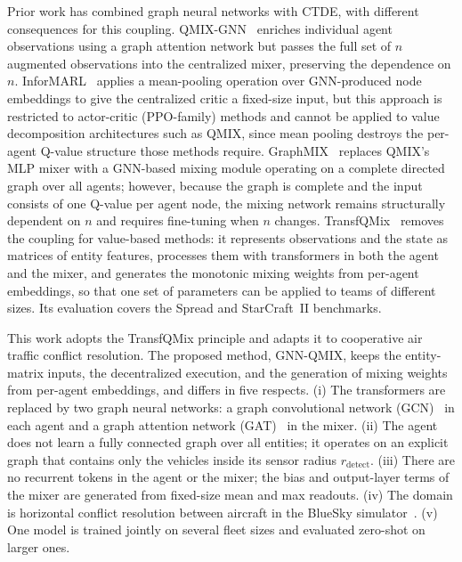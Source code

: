 Prior work has combined graph neural networks with CTDE, with different consequences for
this coupling. QMIX-GNN~\cite{qmix-gnn} enriches individual agent observations using a
graph attention network but passes the full set of $n$ augmented observations into the
centralized mixer, preserving the dependence on $n$. InforMARL~\cite{nayak2023scalable}
applies a mean-pooling operation over GNN-produced node embeddings to give the centralized
critic a fixed-size input, but this approach is restricted to actor-critic (PPO-family)
methods and cannot be applied to value decomposition architectures such as QMIX, since mean
pooling destroys the per-agent Q-value structure those methods require.
GraphMIX~\cite{naderializadeh2021graphconvolutionalvaluedecomposition} replaces QMIX's MLP
mixer with a GNN-based mixing module operating on a complete directed graph over all
agents; however, because the graph is complete and the input consists of one Q-value per
agent node, the mixing network remains structurally dependent on $n$ and requires
fine-tuning when $n$ changes.
TransfQMix~\cite{transfqmix} removes the coupling for value-based methods: it represents
observations and the state as matrices of entity features, processes them with transformers
in both the agent and the mixer, and generates the monotonic mixing weights from per-agent
embeddings, so that one set of parameters can be applied to teams of different sizes. Its
evaluation covers the Spread and StarCraft~II benchmarks.

This work adopts the TransfQMix principle and adapts it to cooperative air traffic conflict
resolution. The proposed method, GNN-QMIX, keeps the entity-matrix inputs, the decentralized
execution, and the generation of mixing weights from per-agent embeddings, and differs in
five respects. (i) The transformers are replaced by two graph neural networks: a graph
convolutional network (GCN)~\cite{gcn} in each agent and a graph attention network
(GAT)~\cite{gat} in the mixer. (ii) The agent does not learn a fully connected graph over
all entities; it operates on an explicit graph that contains only the vehicles inside its
sensor radius $r_{\text{detect}}$. (iii) There are no recurrent tokens in the agent or the
mixer; the bias and output-layer terms of the mixer are generated from fixed-size mean and
max readouts. (iv) The domain is horizontal conflict resolution between aircraft in the
BlueSky simulator~\cite{bluesky,bluesky-gym}. (v) One model is trained jointly on several
fleet sizes and evaluated zero-shot on larger ones.


